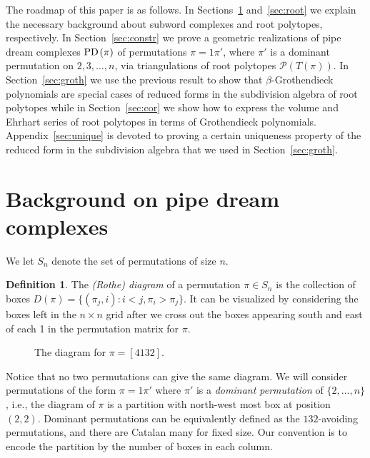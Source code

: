 \documentclass[10pt]{amsart}
\theoremstyle{definition}
\newtheorem{defi}[theo]{Definition}
\numberwithin{equation}{section}
\renewcommand*\P{{\mathcal{P}}}
\newcommand*\+{\smash{\lower2pt\hbox{\rlap{\vrule height14pt}}\raise2pt\hbox{\rlap{\hskip-3pt \vrule height.4pt depth0pt width14.7pt}}}}
\newcommand*{\MK}{\mkern 2mu}
\DeclareMathOperator{\PD}{\textit{PD}\MK}
\begin{document}
The roadmap of this paper is as follows. In Sections~\ref{sec:pipe} and~\ref{sec:root} we explain the necessary background about subword complexes and root polytopes, respectively. In Section~\ref{sec:constr} we prove a geometric realizations of pipe dream complexes $\PD(\pi)$ of permutations $\pi=1\pi'$, where $\pi'$ is a dominant permutation on $2,3,\dots, n$, via triangulations of root polytopes $\P(T(\pi))$. In Section~\ref{sec:groth} we use the previous result to show that $\beta$-Grothendieck polynomials are special cases of reduced forms in the subdivision algebra of root polytopes while in Section~\ref{sec:cor} we show how to express the volume and Ehrhart series of root polytopes in terms of Grothendieck polynomials. Appendix~\ref{sec:unique} is devoted to proving a certain uniqueness property of the reduced form in the subdivision algebra that we used in Section~\ref{sec:groth}.


\section{Background on pipe dream complexes}\label{sec:pipe}

We let $S_n$ denote the set of permutations of size $n$.

\begin{defi}
The \emph{(Rothe) diagram} of a permutation $\pi\in S_n$ is the collection of boxes $D(\pi)=\{(\pi_j,i): i<j, \pi_i>\pi_j\}$. It can be visualized by considering the boxes left in the $n\times n$ grid after we cross out the boxes appearing south and east of each 1 in the permutation matrix for $\pi$.
\end{defi}

\begin{figure}[h]
\caption{The diagram for $\pi=[4132]$.}
\end{figure}

Notice that no two permutations can give the same diagram. We will consider permutations of the form $\pi=1\pi'$ where $\pi'$ is a \emph{dominant permutation} of $\{2,\dots,n\}$, i.e., the diagram of $\pi$ is a partition with north-west most box at position $(2,2)$. Dominant permutations can be equivalently defined as the $132$-avoiding permutations, and there are Catalan many for fixed size. Our convention is to encode the partition by the number of boxes in each column.
\end{document}
